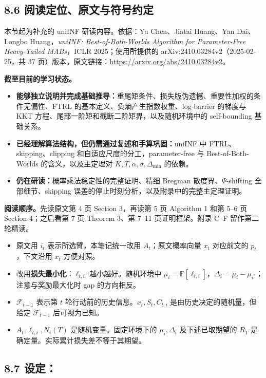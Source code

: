 \clearpage
\subsection{8.6 阅读定位、原文与符号约定}

本节起为补充的 uniINF 研读内容。依据：Yu Chen、Jiatai Huang、Yan Dai、Longbo Huang，\emph{uniINF: Best-of-Both-Worlds Algorithm for Parameter-Free Heavy-Tailed MABs}，ICLR 2025；使用所提供的 arXiv:2410.03284v2（2025-02-25，共 37 页）版本。原文链接：\url{https://arxiv.org/abs/2410.03284v2}。

\textbf{截至目前的学习状态。}
\begin{itemize}
\item \textbf{能够独立说明并完成基础推导：}重尾矩条件、损失版伪遗憾、重要性加权的条件无偏性、FTRL 的基本定义、负熵产生指数权重、log-barrier 的梯度与 KKT 方程、尾部一阶矩和截断二阶矩界，以及随机环境中的 self-bounding 基础关系。
\item \textbf{已经理解算法结构，但仍需通过复述和手算巩固：}uniINF 中 FTRL、skipping、clipping 和自适应尺度的分工，parameter-free 与 Best-of-Both-Worlds 的含义，以及主定理对 $K,T,\alpha,\sigma,\Delta_{\min}$ 的依赖。
\item \textbf{仍在研读：}概率乘法稳定性的完整证明、精细 Bregman 散度界、$\Psi$-shifting 全部细节、skipping 误差的停止时刻分析，以及附录中的完整主定理证明。
\end{itemize}

\textbf{阅读顺序。}先读原文第 4 页 Section 3，再读第 5 页 Algorithm 1 和第 5--6 页 Section 4；之后看第 7 页 Theorem 3、第 7--11 页证明框架。附录 C--F 留作第二轮精读。

\begin{itemize}
\item 原文用 $i_t$ 表示所选臂，本笔记统一改用 $A_t$；原文概率向量 $x_t$ 对应前文的 $p_t$，下文沿用 $x_t$ 方便对照。
\item 改用\textbf{损失最小化}：$\ell_{t,i}$ 越小越好。随机环境中 $\mu_i=\mathbb E[\ell_{t,i}]$，$\Delta_i=\mu_i-\mu_{i^*}$；注意与奖励最大化时 gap 的方向相反。
\item $\mathcal F_{t-1}$ 表示第 $t$ 轮行动前的历史信息。$x_t,S_t,C_{t,i}$ 是由历史决定的随机量，但给定 $\mathcal F_{t-1}$ 后可视为已知。
\item $A_t,\ell_{t,i},N_i(T)$ 是随机变量。固定环境下的 $\mu_i,\Delta_i$ 及下述已取期望的 $R_T$ 是确定量。实际累计损失差不等于其期望。
\end{itemize}

\subsection{8.7 设定：}

